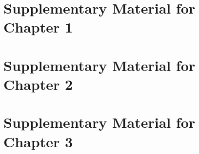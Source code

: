 \documentclass[12pt,letterpaper,oneside,final]{memoir}
\begin{document}
\newpage
\clearpage

\begin{appendices}

\appendix
{}

\chapter{Supplementary Material for Chapter 1} \label{sec:Appendix1}

  
  

\chapter{Supplementary Material for Chapter 2} \label{sec:Appendix2}

  
  

\newpage
\clearpage

\chapter{Supplementary Material for Chapter 3} \label{sec:Appendix3}

  
  

\end{appendices}

\newpage

\clearpage

\backmatter


  \begin{OnehalfSpace}
    
    
  \end{OnehalfSpace}
\end{document}

